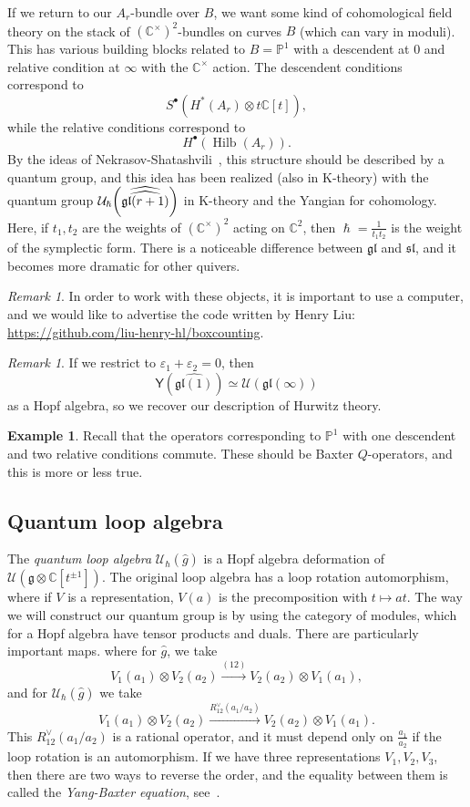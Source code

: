 \documentclass[leqno, openany]{memoir}
\theoremstyle{definition}
\newtheorem{exm}[thm]{Example}
\theoremstyle{remark}
\newtheorem{rmk}[thm]{Remark}
\theoremstyle{plain}
\theoremstyle{definition}
\theoremstyle{remark}
\newcommand{\C}{\mathbb{C}}
\renewcommand{\P}{\mathbb{P}}
\newcommand{\ep}{\varepsilon}
\newcommand{\mc}[1]{\mathcal{#1}}
\newcommand{\mf}[1]{\mathfrak{#1}}
\newcommand{\ms}[1]{\mathsf{#1}}
\newcommand{\wh}[1]{\widehat{#1}}
\DeclareMathOperator{\Hilb}{Hilb}
\begin{document}
If we return to our $A_r$-bundle over $B$, we want some kind of cohomological field theory on the stack of $(\C^{\times})^2$-bundles on curves $B$ (which can vary in moduli). This has various building blocks related to $B = \P^1$ with a descendent at $0$ and relative condition at $\infty$ with the $\C^{\times}$ action. The descendent conditions correspond to
\[ S^{\bullet}(H^*(A_r) \otimes t \C[t]), \]
while the relative conditions correspond to 
\[ H^{\bullet}(\Hilb(A_r)). \]
By the ideas of Nekrasov-Shatashvili~\cite{nekshat}, this structure should be described by a quantum group, and this idea has been realized (also in K-theory) with the quantum group $\mc{U}_{\hslash}\qty(\wh{\wh{\mf{gl}(r+1)}})$ in K-theory and the Yangian for cohomology. Here, if $t_1, t_2$ are the weights of $(\C^{\times})^2$ acting on $\C^2$, then $\hslash = \frac{1}{t_1 t_2}$ is the weight of the symplectic form. There is a noticeable difference between $\mf{gl}$ and $\mf{sl}$, and it becomes more dramatic for other quivers.

\begin{rmk}
    In order to work with these objects, it is important to use a computer, and we would like to advertise the code written by Henry Liu: \url{https://github.com/liu-henry-hl/boxcounting}.
\end{rmk}

\begin{rmk}
    If we restrict to $\ep_1 + \ep_2 = 0$, then
    \[ \ms{Y}(\wh{\mf{gl}(1)}) \simeq \mc{U}(\mf{gl}(\infty)) \]
    as a Hopf algebra, so we recover our description of Hurwitz theory.
\end{rmk}

\begin{exm}
    Recall that the operators corresponding to $\P^1$ with one descendent and two relative conditions commute. These should be Baxter $Q$-operators, and this is more or less true.
\end{exm}

\subsection{Quantum loop algebra}

The \textit{quantum loop algebra} $\mc{U}_{\hslash}(\wh{g})$ is a Hopf algebra deformation of $\mc{U}(\mf{g} \otimes \C[t^{\pm 1}])$. The original loop algebra has a loop rotation automorphism, where if $V$ is a representation, $V(a)$ is the precomposition with $t \mapsto at$. The way we will construct our quantum group is by using the category of modules, which for a Hopf algebra have tensor products and duals. There are particularly important maps. where for $\wh{g}$, we take
\[ V_1(a_1) \otimes V_2(a_2) \xrightarrow{(1 2)} V_2(a_2) \otimes V_1(a_1), \]
and for $\mc{U}_{\hslash}(\wh{g})$ we take
\[ V_1(a_1) \otimes V_2(a_2) \xrightarrow{R_{12}^{\vee}(a_1/a_2)} V_2(a_2) \otimes V_1(a_1). \]
This $R_{12}^{\vee}(a_1/a_2)$ is a rational operator, and it must depend only on $\frac{a_1}{a_2}$ if the loop rotation is an automorphism. If we have three representations $V_1, V_2, V_3$, then there are two ways to reverse the order, and the equality between them is called the \textit{Yang-Baxter equation}, see~.
\end{document}
